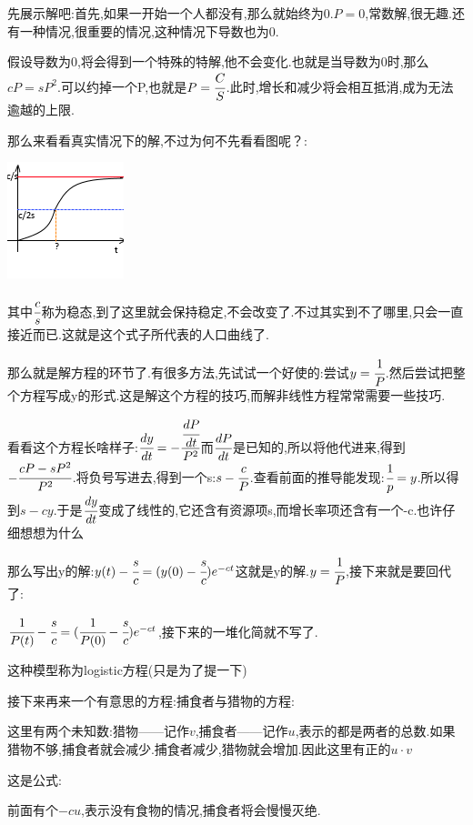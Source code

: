 \documentclass[UTF8,12pt]{ctexbook}
\begin{document}
{{{{  先展示解吧:首先,如果一开始一个人都没有,那么就始终为0.$P = 0$,常数解,很无趣.还有一种情况,很重要的情况,这种情况下导数也为0.

  假设导数为0,将会得到一个特殊的特解,他不会变化.也就是当导数为0时,那么$cP = sP^2$.可以约掉一个P,也就是$P = \cfrac{C}{S}$.此时,增长和减少将会相互抵消,成为无法逾越的上限.

  那么来看看真实情况下的解,不过为何不先看看图呢？:

  \begin{center}
    \includegraphics{resources/nonLinearDifferencialEquation_HumanGrow.png}
  \end{center}

  其中$\cfrac{c}{s}$称为稳态,到了这里就会保持稳定,不会改变了.不过其实到不了哪里,只会一直接近而已.这就是这个式子所代表的人口曲线了.

  那么就是解方程的环节了.有很多方法,先试试一个好使的:尝试$y = \cfrac{1}{P}$.然后尝试把整个方程写成y的形式.这是解这个方程的技巧,而解非线性方程常常需要一些技巧.

  看看这个方程长啥样子:$\cfrac{dy}{dt} = -\cfrac{\cfrac{dP}{dt}}{P^2}$而$\cfrac{dP}{dt}$是已知的,所以将他代进来,得到$-\cfrac{cP - sP^2}{P^2}$.将负号写进去,得到一个s:$s - \cfrac{c}{P}$.查看前面的推导能发现:$\cfrac{1}{p} = y$.所以得到$s - cy$.于是$\cfrac{dy}{dt}$变成了线性的,它还含有资源项s,而增长率项还含有一个-c.也许仔细想想为什么

  那么写出y的解:$y(t) - \cfrac{s}{c} = (y(0) - \cfrac{s}{c})e^{-ct}$这就是y的解.$y = \cfrac{1}{P}$,接下来就是要回代了:

  $\cfrac{1}{P(t)} - \cfrac{s}{c} = (\cfrac{1}{P(0)} - \cfrac{s}{c})e^{-ct}$,接下来的一堆化简就不写了.

  这种模型称为logistic方程(只是为了提一下)

  接下来再来一个有意思的方程:捕食者与猎物的方程:

  这里有两个未知数:猎物——记作$v$,捕食者——记作$u$,表示的都是两者的总数.如果猎物不够,捕食者就会减少.捕食者减少,猎物就会增加.因此这里有正的$u \cdot v$

  这是公式:

  前面有个$-cu$,表示没有食物的情况,捕食者将会慢慢灭绝.

}}}}
\end{document}
